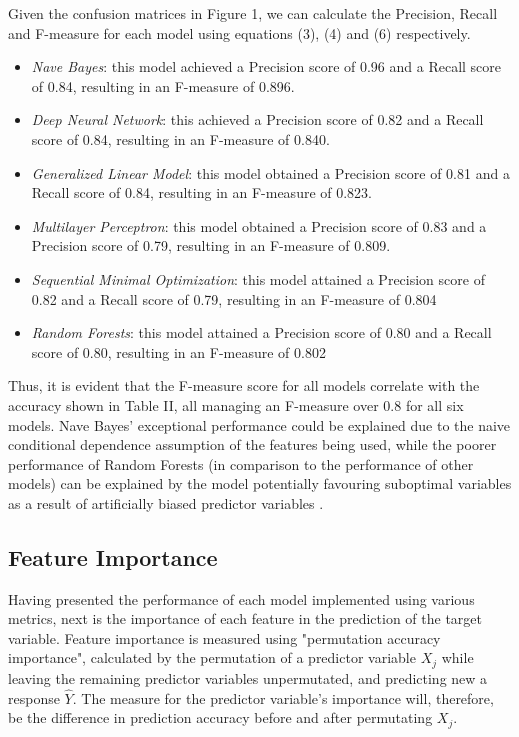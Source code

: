 \documentclass[conference]{IEEEtran}
\begin{document}
Given the confusion matrices in Figure 1, we can calculate the Precision, Recall and F-measure for each model using equations (3), (4) and (6) respectively.
\begin{itemize}
\item{\textit{Nave Bayes}: this model achieved a Precision score of 0.96 and a Recall score of 0.84, resulting in an F-measure of 0.896.}
\item{\textit{Deep Neural Network}: this achieved a Precision score of 0.82 and a Recall score of 0.84, resulting in an F-measure of 0.840.}
\item{\textit{Generalized Linear Model}: this model obtained a Precision score of 0.81 and a Recall score of 0.84, resulting in an F-measure of 0.823.}
\item{\textit{Multilayer Perceptron}: this model obtained a Precision score of 0.83 and a Precision score of 0.79, resulting in an F-measure of 0.809.}
\item{\textit{Sequential Minimal Optimization}: this model attained a Precision score of 0.82 and a Recall score of 0.79, resulting in an F-measure of 0.804}
\item{\textit{Random Forests}: this model attained a Precision score of 0.80 and a Recall score of 0.80, resulting in an F-measure of 0.802}
\end{itemize}

Thus, it is evident that the F-measure score for all models correlate with the accuracy shown in Table II, all managing an F-measure over 0.8 for all six models. Nave Bayes' exceptional performance could be explained due to the naive conditional dependence assumption of the features being used, while the poorer performance of Random Forests (in comparison to the performance of other models) can be explained by the model potentially favouring suboptimal variables as a result of artificially biased predictor variables \cite{b12}.

\subsection{Feature Importance}
Having presented the performance of each model implemented using various metrics, next is the importance of each feature in the prediction of the target variable. Feature importance is measured using "permutation accuracy importance", calculated by the permutation of a predictor variable \(X_j\) while leaving the remaining predictor variables unpermutated, and predicting new a response \(\hat{Y}\). The measure for the predictor variable's importance will, therefore, be the difference in prediction accuracy before and after permutating \(X_j\).
\end{document}
